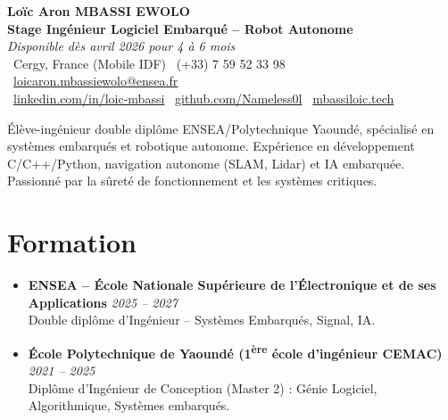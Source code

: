 \documentclass[a4paper,11pt]{article}
\begin{document}
\begin{center}
    {\Large \textbf{Loïc Aron MBASSI EWOLO}} \\ \vspace{4pt}
    \textbf{\large Stage Ingénieur Logiciel Embarqué -- Robot Autonome} \\
    \textit{\small Disponible dès avril 2026 pour 4 à 6 mois} \\ \vspace{4pt}
    \small
    \faMapMarker\ Cergy, France (Mobile IDF) \quad
    \faPhone\ (+33) 7 59 52 33 98 \quad
    \faEnvelope\ \href{mailto:loicaron.mbassiewolo@ensea.fr}{loicaron.mbassiewolo@ensea.fr} \\ \vspace{2pt}
    \faLinkedin\ \href{https://www.linkedin.com/in/loic-mbassi/}{linkedin.com/in/loic-mbassi} \quad
    \faGithub\ \href{https://github.com/Nameless0l}{github.com/Nameless0l} \quad
    \faGlobe\ \href{https://mbassiloic.tech}{mbassiloic.tech}
\end{center}

\vspace{-6pt}

\noindent\small{Élève-ingénieur double diplôme ENSEA/Polytechnique Yaoundé, spécialisé en systèmes embarqués et robotique autonome. Expérience en développement C/C++/Python, navigation autonome (SLAM, Lidar) et IA embarquée. Passionné par la sûreté de fonctionnement et les systèmes critiques.}

\section{Formation}
\begin{itemize}[leftmargin=*, label=\tiny$\bullet$, nosep]
    \item \textbf{ENSEA -- École Nationale Supérieure de l'Électronique et de ses Applications} \hfill \textit{2025 -- 2027} \\
    \small{Double diplôme d'Ingénieur -- Systèmes Embarqués, Signal, IA.}
    \item \textbf{École Polytechnique de Yaoundé (1\textsuperscript{ère} école d'ingénieur CEMAC)} \hfill \textit{2021 -- 2025} \\
    \small{Diplôme d'Ingénieur de Conception (Master 2) : Génie Logiciel, Algorithmique, Systèmes embarqués.}
\end{itemize}

\end{document}
